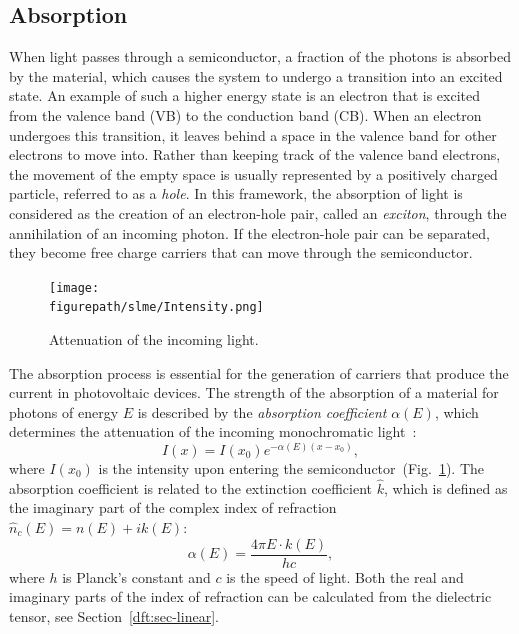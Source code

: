 \begin{refsection}
\subsection{Absorption}\label{slme:sec-absorption} 
 
When light passes through a semiconductor, a fraction of the photons is 
absorbed by the material, which causes the system to undergo a transition into 
an excited state. An example of such a higher energy state is an electron that 
is excited from the valence band (VB) to the conduction band (CB). When an 
electron undergoes this transition, it leaves behind a space in the valence 
band for other electrons to move into. Rather than keeping track of the 
valence band electrons, the movement of the empty space is usually represented 
by a positively charged particle, referred to as a \textit{hole}. In this 
framework, the absorption of light is considered as the creation of an 
electron-hole pair, called an \textit{exciton}, through the annihilation of an 
incoming photon. If the electron-hole pair can be separated, they become 
free charge carriers that can move through the semiconductor. 
 
\begin{figure}
\centering 
\captionsetup{width=0.9\textwidth} 
\texttt{[image: \\figurepath/slme/Intensity.png]} 
\caption{\label{slme:fig-intensity} Attenuation of the incoming light.} 
\end{figure} 
 
The absorption process is essential for the generation of carriers that 
produce the current in photovoltaic devices. The strength of the absorption of 
a material for photons of energy $E$ is described by the \textit{absorption 
coefficient} $\alpha(E)$, which determines the attenuation of the incoming 
monochromatic light~\cite{Green1981}: 
\begin{equation}\label{slme:eq-intensity} 
I(x) = I(x_0)e^{-\alpha(E) (x - x_0)}, 
\end{equation} 
where $I(x_0)$ is the intensity upon entering the 
semiconductor~(Fig.~\ref{slme:fig-intensity}). The absorption coefficient is 
related to the extinction coefficient $\hat{k}$, which is defined as the 
imaginary part of the complex index of refraction $\hat{n}_c(E)=n(E)+ik(E)$: 
\begin{equation}\label{slme:eq-absorption} 
\alpha (E)= \frac{4 \pi E \cdot k(E)}{h c}, 
\end{equation} 
where $h$ is Planck's constant and $c$ is the speed of light. Both the real 
and imaginary parts of the index of refraction can be calculated from the 
dielectric tensor, see Section~\ref{dft:sec-linear}. 
 

\end{refsection}
